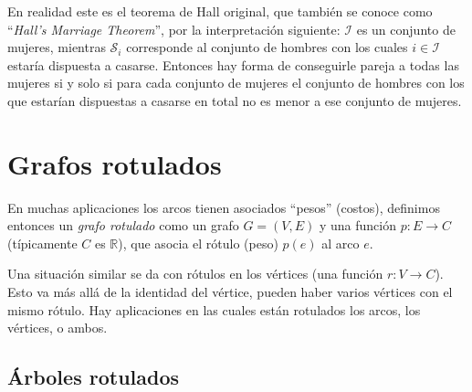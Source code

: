   En realidad este es el teorema de Hall original,
  que también se conoce
  como ``\emph{\foreignlanguage{english}{Hall's Marriage Theorem}}'',
  por la interpretación siguiente:
  \(\mathcal{I}\) es un conjunto de mujeres,
  mientras \(\mathcal{S}_i\) corresponde al conjunto de hombres
  con los cuales \(i \in \mathcal{I}\) estaría dispuesta a casarse.
  Entonces hay forma de conseguirle pareja a todas las mujeres
  si y solo si para cada conjunto de mujeres
  el conjunto de hombres
  con los que estarían dispuestas a casarse en total
  no es menor a ese conjunto de mujeres.


\section{Grafos rotulados}
\label{sec:grafos-rotulados}

  En muchas aplicaciones
  los arcos tienen asociados ``pesos'' (costos),
  definimos entonces un \emph{grafo rotulado} como un grafo
  \(G = (V, E)\) y una función \(p \colon E \rightarrow C\)
  (típicamente \(C\) es \(\mathbb{R}\)),
  que asocia el rótulo
  (peso)
  \(p(e)\) al arco \(e\).

  Una situación similar se da con rótulos en los vértices
  (una función \(r \colon V \rightarrow C\)).
  Esto va más allá de la identidad del vértice,
  pueden haber varios vértices con el mismo rótulo.
  Hay aplicaciones en las cuales están rotulados los arcos,
  los vértices,
  o ambos.

\subsection{Árboles rotulados}
\label{sec:arboles-rotulados}


